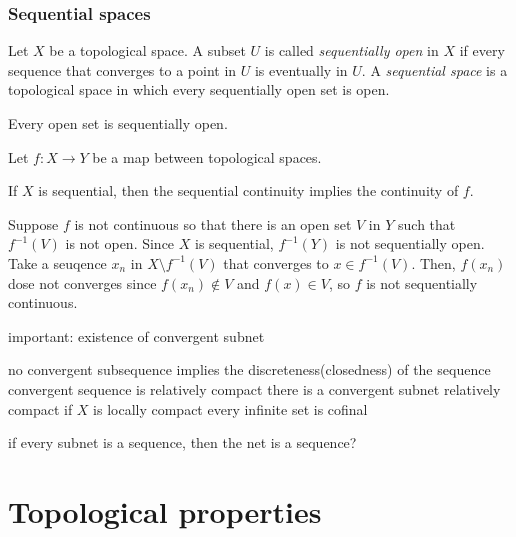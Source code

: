 \documentclass{../../large}
\begin{document}
\section{Sequential spaces}



\begin{prb}
Let $X$ be a topological space.
A subset $U$ is called \emph{sequentially open} in $X$ if every sequence that converges to a point in $U$ is eventually in $U$.
A \emph{sequential space} is a topological space in which every sequentially open set is open.
\begin{parts}
\item Every open set is sequentially open.
\item
\end{parts}
\end{prb}

\begin{prb}
Let $f:X\to Y$ be a map between topological spaces.
\begin{parts}
\item If $X$ is sequential, then the sequential continuity implies the continuity of $f$.
\end{parts}
\end{prb}
\begin{pf}
Suppose $f$ is not continuous so that there is an open set $V$ in $Y$ such that $f^{-1}(V)$ is not open.
Since $X$ is sequential, $f^{-1}(Y)$ is not sequentially open.
Take a seuqence $x_n$ in $X\setminus f^{-1}(V)$ that converges to $x\in f^{-1}(V)$.
Then, $f(x_n)$ dose not converges since $f(x_n)\notin V$ and $f(x)\in V$, so $f$ is not sequentially continuous.
\end{pf}

\begin{prb}
\end{prb}


important: existence of convergent subnet

no convergent subsequence implies the discreteness(closedness) of the sequence
convergent sequence is relatively compact
there is a convergent subnet relatively compact if $X$ is locally compact
every infinite set is cofinal


if every subnet is a sequence, then the net is a sequence?


\part{Topological properties}
\end{document}
